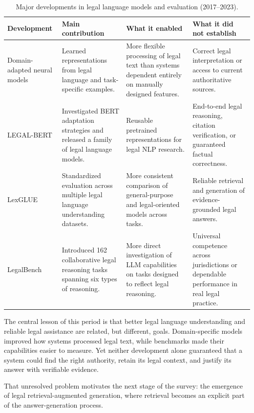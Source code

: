 \begin{table}[tp]
\centering
\caption{Major developments in legal language models and evaluation (2017--2023).}
\label{tab:lmdev}
\footnotesize
\setlength{\tabcolsep}{5pt}
\renewcommand{\arraystretch}{1.3}
\begin{tabularx}{\textwidth}{>{\raggedright\arraybackslash}p{2.8cm} >{\raggedright\arraybackslash}X >{\raggedright\arraybackslash}X >{\raggedright\arraybackslash}X}
\toprule
\textbf{Development} & \textbf{Main contribution} & \textbf{What it enabled} & \textbf{What it did not establish} \\
\midrule
Domain-adapted neural models & Learned representations from legal language and task-specific examples. & More flexible processing of legal text than systems dependent entirely on manually designed features. & Correct legal interpretation or access to current authoritative sources. \\
LEGAL-BERT \citep{chalkidis2020} & Investigated BERT adaptation strategies and released a family of legal language models. & Reusable pretrained representations for legal NLP research. & End-to-end legal reasoning, citation verification, or guaranteed factual correctness. \\
LexGLUE \citep{chalkidis2022} & Standardized evaluation across multiple legal language understanding datasets. & More consistent comparison of general-purpose and legal-oriented models across tasks. & Reliable retrieval and generation of evidence-grounded legal answers. \\
LegalBench \citep{guha2023} & Introduced 162 collaborative legal reasoning tasks spanning six types of reasoning. & More direct investigation of LLM capabilities on tasks designed to reflect legal reasoning. & Universal competence across jurisdictions or dependable performance in real legal practice. \\
\bottomrule
\end{tabularx}
\end{table}

The central lesson of this period is that better legal language understanding and reliable legal
assistance are related, but different, goals. Domain-specific models improved how systems processed
legal text, while benchmarks made their capabilities easier to measure. Yet neither development alone
guaranteed that a system could find the right authority, retain its legal context, and justify its
answer with verifiable evidence.

That unresolved problem motivates the next stage of the survey: the emergence of legal
retrieval-augmented generation, where retrieval becomes an explicit part of the answer-generation
process.
